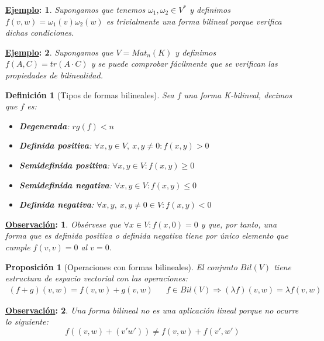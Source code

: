 \documentclass[10pt,a4paper,openright]{book}
\theoremstyle{break}
\newtheorem*{defi}{Definición}
\newtheorem*{prop}{Proposición}
\newtheorem*{obs}{\underline{Observación}:}
\newtheorem*{ej}{\underline{Ejemplo}:}
\begin{document}
\begin{ej}
Supongamos que tenemos $\omega_1, \omega_2\in V^*$ y definimos $f(v,w)=\omega_1(v)\omega_2(w)$ es trivialmente una forma bilineal porque verifica dichas condiciones.
\end{ej}

\begin{ej}
Supongamos que $V=Mat_n(K)$ y definimos $f(A,C)=tr(A\cdot C)$ y se puede comprobar fácilmente que se verifican las propiedades de bilinealidad.
\end{ej}

\begin{defi}[Tipos de formas bilineales]
Sea $f$ una forma K-bilineal, decimos que $f$ es:
\begin{itemize}
\item \textbf{Degenerada}: $rg(f)< n$
\item \textbf{Definida positiva}: $\forall x,y \in V, \ x,y\neq 0: f(x,y) > 0$
\item \textbf{Semidefinida positiva}: $\forall x,y \in V: f(x,y) \geq 0$
\item \textbf{Semidefinida negativa}: $ \forall x,y \in V: f(x,y) \leq 0$
\item \textbf{Definida negativa}: $ \forall x,y, \ x,y\neq 0 \in V: f(x,y) < 0$
\end{itemize}
\end{defi}

\begin{obs}
Obsérvese que $\forall x \in V: f(x,0) = 0$ y que, por tanto, una forma que es definida positiva o definida negativa tiene por único elemento que cumple $f(v,v) = 0$ al $v=0$.
\end{obs}

\begin{prop}[Operaciones con formas bilineales]
El conjunto $Bil(V)$ tiene estructura de espacio vectorial con las operaciones:
\begin{align*}
(f+g)(v,w)=f(v,w)+g(v,w) & & f\in Bil(V)\Rightarrow (\lambda f)(v,w)=\lambda f(v,w)
\end{align*}
\end{prop}

\begin{obs}
Una forma bilineal no es una aplicación lineal porque no ocurre lo siguiente:
$$f((v,w)+(v'w'))\neq f(v,w)+f(v',w')$$
\end{obs}
\end{document}
